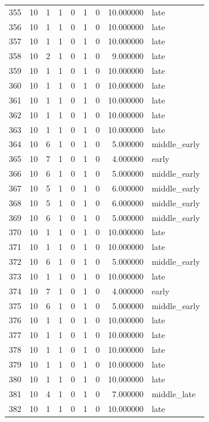 \begin{longtable}{rrrrrrrrl}
355 & 10 & 1 & 1 & 0 & 1 & 0 & 10.000000 & late \\
356 & 10 & 1 & 1 & 0 & 1 & 0 & 10.000000 & late \\
357 & 10 & 1 & 1 & 0 & 1 & 0 & 10.000000 & late \\
358 & 10 & 2 & 1 & 0 & 1 & 0 & 9.000000 & late \\
359 & 10 & 1 & 1 & 0 & 1 & 0 & 10.000000 & late \\
360 & 10 & 1 & 1 & 0 & 1 & 0 & 10.000000 & late \\
361 & 10 & 1 & 1 & 0 & 1 & 0 & 10.000000 & late \\
362 & 10 & 1 & 1 & 0 & 1 & 0 & 10.000000 & late \\
363 & 10 & 1 & 1 & 0 & 1 & 0 & 10.000000 & late \\
364 & 10 & 6 & 1 & 0 & 1 & 0 & 5.000000 & middle\_early \\
365 & 10 & 7 & 1 & 0 & 1 & 0 & 4.000000 & early \\
366 & 10 & 6 & 1 & 0 & 1 & 0 & 5.000000 & middle\_early \\
367 & 10 & 5 & 1 & 0 & 1 & 0 & 6.000000 & middle\_early \\
368 & 10 & 5 & 1 & 0 & 1 & 0 & 6.000000 & middle\_early \\
369 & 10 & 6 & 1 & 0 & 1 & 0 & 5.000000 & middle\_early \\
370 & 10 & 1 & 1 & 0 & 1 & 0 & 10.000000 & late \\
371 & 10 & 1 & 1 & 0 & 1 & 0 & 10.000000 & late \\
372 & 10 & 6 & 1 & 0 & 1 & 0 & 5.000000 & middle\_early \\
373 & 10 & 1 & 1 & 0 & 1 & 0 & 10.000000 & late \\
374 & 10 & 7 & 1 & 0 & 1 & 0 & 4.000000 & early \\
375 & 10 & 6 & 1 & 0 & 1 & 0 & 5.000000 & middle\_early \\
376 & 10 & 1 & 1 & 0 & 1 & 0 & 10.000000 & late \\
377 & 10 & 1 & 1 & 0 & 1 & 0 & 10.000000 & late \\
378 & 10 & 1 & 1 & 0 & 1 & 0 & 10.000000 & late \\
379 & 10 & 1 & 1 & 0 & 1 & 0 & 10.000000 & late \\
380 & 10 & 1 & 1 & 0 & 1 & 0 & 10.000000 & late \\
381 & 10 & 4 & 1 & 0 & 1 & 0 & 7.000000 & middle\_late \\
382 & 10 & 1 & 1 & 0 & 1 & 0 & 10.000000 & late \\

\end{longtable}
